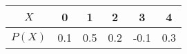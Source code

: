 \begin{tabular}{|c|c|c|c|c|c|} 
    \hline
    $X$ & 0 & 1 & 2 & 3 & 4 
    \\
    \hline
    $P(X)$ & 0.1 & 0.5 & 0.2 & -0.1 & 0.3 
    \\
    \hline
\end{tabular}
